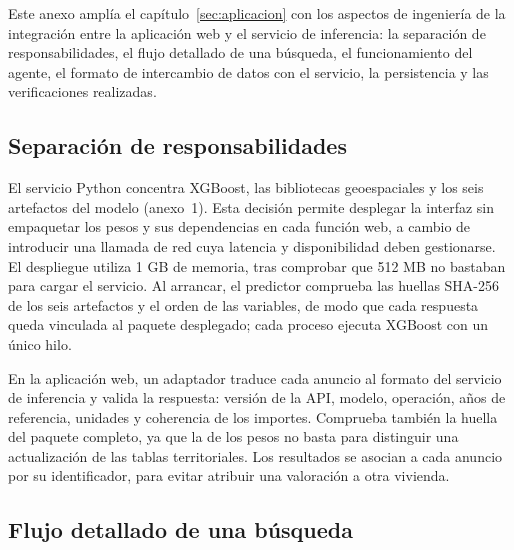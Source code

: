 \documentclass[11pt,a4paper]{article}
\newcounter{anexo}
\newcounter{anexosub}[anexo]
\begin{document}
Este anexo amplía el capítulo~\ref{sec:aplicacion} con los aspectos de ingeniería de la integración entre la aplicación web y el servicio de inferencia: la separación de responsabilidades, el flujo detallado de una búsqueda, el funcionamiento del agente, el formato de intercambio de datos con el servicio, la persistencia y las verificaciones realizadas.

%
\subsection*{\theanexo\hspace{0.3em}\hspace{0.45em}Separación de responsabilidades}

El servicio Python concentra XGBoost, las bibliotecas geoespaciales y los seis artefactos del modelo (anexo~1). Esta decisión permite desplegar la interfaz sin empaquetar los pesos y sus dependencias en cada función web, a cambio de introducir una llamada de red cuya latencia y disponibilidad deben gestionarse. El despliegue utiliza 1 GB de memoria, tras comprobar que 512 MB no bastaban para cargar el servicio. Al arrancar, el predictor comprueba las huellas SHA-256 de los seis artefactos y el orden de las variables, de modo que cada respuesta queda vinculada al paquete desplegado; cada proceso ejecuta XGBoost con un único hilo.

En la aplicación web, un adaptador traduce cada anuncio al formato del servicio de inferencia y valida la respuesta: versión de la API, modelo, operación, años de referencia, unidades y coherencia de los importes. Comprueba también la huella del paquete completo, ya que la de los pesos no basta para distinguir una actualización de las tablas territoriales. Los resultados se asocian a cada anuncio por su identificador, para evitar atribuir una valoración a otra vivienda.

%
\subsection*{\theanexo\hspace{0.3em}\hspace{0.45em}Flujo detallado de una búsqueda}
\end{document}

